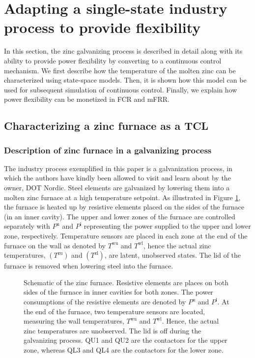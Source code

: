 \documentclass[conference]{IEEEtran}
\begin{document}
\section{Adapting a single-state industry process to provide flexibility}\label{sec:zinc_furnace_description}

In this section, the zinc galvanizing process is described in detail along with its ability to provide power flexibility by converting to a continuous control mechanism.
%
We first describe how the temperature of the molten zinc can be characterized using state-space models. Then, it is shown how this model can be used for subsequent simulation of continuous control. Finally, we explain how power flexibility can be monetized in FCR and mFRR.

\subsection{Characterizing a zinc furnace as a TCL}



\subsubsection{Description of zinc furnace in a galvanizing process}

The industry process exemplified in this paper is a galvanization process, in which the authors have kindly been allowed to visit and learn about by the owner, DOT Nordic. Steel elements are galvanized by lowering them into a molten zinc furnace at a high temperature setpoint. As illustrated in Figure \ref{fig:furnace_schematic_tikz}, the furnace is heated up by resistive elements placed on the sides of the furnace (in an inner cavity). The upper and lower zones of the furnace are controlled separately with $P^{\text{u}}$ and $P^{\text{l}}$ representing the power supplied to the upper and lower zone, respectively. Temperature sensors are placed in each zone at the end of the furnace on the wall as denoted by $T^{\text{wu}}$ and $T^{\text{wl}}$, hence the actual zinc temperatures, $(T^{\text{zu}})$ and $(T^{\text{zl}})$, are latent, unobserved states. The lid of the furnace is removed when lowering steel into the furnace.

\begin{figure}[t]
    \centering
    
    \caption{Schematic of the zinc furnace. Resistive elements are places on both sides of the furnace in inner cavities for both zones. The power consumptions of the resistive elements are denoted by $P^{\text{u}}$ and $P^{\text{l}}$. At the end of the furnace, two temperature sensors are located, measuring the wall temperatures, $T^{\text{wu}}$ and $T^{\text{wl}}$. Hence, the actual zinc temperatures are unobserved. The lid is off during the galvanizing process. QU1 and QU2 are the contactors for the upper zone, whereas QL3 and QL4 are the contactors for the lower zone.}
    \label{fig:furnace_schematic_tikz}
\end{figure}
\end{document}
